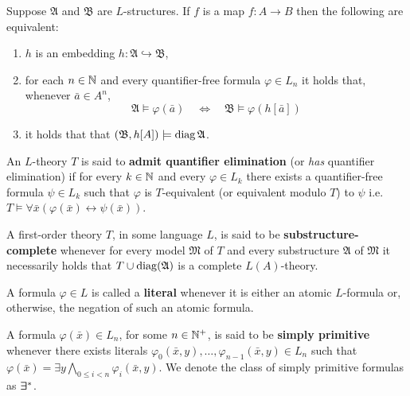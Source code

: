 \begin{lem}\label{lem:diag}
	Suppose $\mathfrak{A}$ and $\mathfrak{B}$ are $L$-structures.  If $f$ is a map $f\colon A\to B$ then the following are equivalent:
	\begin{enumerate}
		\item	$h$ is an embedding $h\colon\mathfrak{A}\hookrightarrow\mathfrak{B}$,
		\item	for each $n\in\mathbb{N}$ and every quantifier-free formula $\varphi\in L_n$ it holds that, whenever $\bar{a}\in A^n$,
			\begin{equation}
				\mathfrak{A}\models\varphi(\bar{a}) \quad\iff\quad \mathfrak{B}\models\varphi(h[\bar{a}])
			\end{equation}
		\item	it holds that that $(\mathfrak{B},h[A])\models\operatorname{diag}\mathfrak{A}$.
	\end{enumerate}
\end{lem}

\begin{dfn}
	An $L$-theory $T$ is said to \textbf{admit quantifier elimination} (or \textit{has} quantifier elimination) if for every $k\in\mathbb{N}$ and every $\varphi\in L_k$ there exists a quantifier-free formula $\psi\in L_k$ such that $\varphi$ is $T$-equivalent (or equivalent modulo $T$) to $\psi$ i.e.\ $T\models\forall\bar{x}(\varphi(\bar{x})\leftrightarrow\psi(\bar{x}))$.
\end{dfn}

\begin{dfn}
	A first-order theory $T$, in some language $L$, is said to be \textbf{substructure-complete} whenever for every model $\mathfrak{M}$ of $T$ and every substructure $\mathfrak{A}$ of $\mathfrak{M}$ it necessarily holds that $T\cup\operatorname{diag}(\mathfrak{A})$ is a complete $L(A)$-theory.
\end{dfn}

\begin{dfn}[Literal]
	A formula $\varphi\in L$ is called a \textbf{literal} whenever it is either an atomic $L$-formula or, otherwise, the negation of such an atomic formula.
\end{dfn}

\begin{dfn}
	A formula $\varphi(\bar{x})\in L_n$, for some $n\in\mathbb{N}^{+}$, is said to be \textbf{simply primitive} whenever there exists literals $\varphi_0(\bar{x},y),\dotsc,\varphi_{n-1}(\bar{x},y)\in L_n$ such that $\varphi(\bar{x})=\exists y\bigwedge_{0\leq i<n}\varphi_i(\bar{x},y)$.  We denote the class of simply primitive formulas as $\bm{\exists}_{}^\ast$.
\end{dfn}

